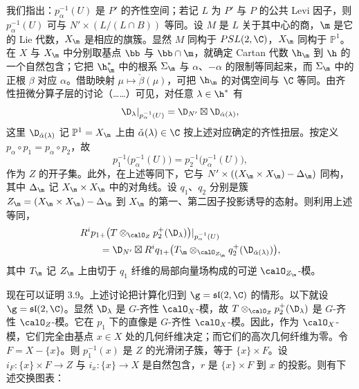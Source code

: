 我们指出：$p_\alpha^{-1}(U)$ 是 $P'$ 的齐性空间；若记 $L$ 为 $P'$ 与 $P$ 的公共 Levi 因子，则 $p_\alpha^{-1}(U)$ 可与 $N'\times(L/(L\cap B))$ 等同。设 $M$ 是 $L$ 关于其中心的商，$\m$ 是它的 Lie 代数，$X_\m$ 是相应的旗簇。显然 $M$ 同构于 $PSL(2,\C)$，$X_\m$ 同构于 $\mathbb{P}^1$。在 $X$ 与 $X_\m$ 中分别取基点 $\bb$ 与 $\bb\cap\m$，就确定 Cartan 代数 $\h_\m$ 到 $\h$ 的一个自然包含；它把 $\h^*_\m$ 中的根系 $\Sigma_\m$ 与 $\alpha$、$-\alpha$ 的限制等同起来，而 $\Sigma_\m$ 中的正根 $\beta$ 对应 $\alpha$。借助映射 $\mu\mapsto\check{\beta}(\mu)$，可把 $\h_\m$ 的对偶空间与 $\C$ 等同。由齐性扭微分算子层的讨论（……）可见，对任意 $\lambda\in\h^*$ 有
$$\D_\lambda|_{p_\alpha^{-1}(U)}=\D_{N'}\boxtimes\D_{\check{\alpha}(\lambda)},$$
这里 $\D_{\check{\alpha}(\lambda)}$ 记 $\mathbb{P}^1=X_\m$ 上由 $\check{\alpha}(\lambda)\in\C$ 按上述对应确定的齐性扭层。按定义 $p_\alpha\circ p_1=p_\alpha\circ p_2$，故
$$p_1^{-1}\bigl(p_\alpha^{-1}(U)\bigr)=p_2^{-1}\bigl(p_\alpha^{-1}(U)\bigr),$$
作为 $Z$ 的开子集。此外，在上述等同下，它与 $N'\times((X_\m\times X_\m)-\Delta_\m)$ 同构，其中 $\Delta_\m$ 记 $X_\m\times X_\m$ 中的对角线。设 $q_1$、$q_2$ 分别是簇 $Z_\m=(X_\m\times X_\m)-\Delta_\m$ 到 $X_\m$ 的第一、第二因子投影诱导的态射。则利用上述等同，
\begin{align*}
&R^ip_{1+}\bigl(T\otimes_{\calO_Z}p_2^+(\D_\lambda)\bigr)|_{p_\alpha^{-1}(U)}\\
&\qquad=\D_{N'}\boxtimes R^iq_{1+}\bigl(T_\m\otimes_{\calO_{Z_\m}}q_2^+(\D_{\check{\alpha}(\lambda)})\bigr),
\end{align*}
其中 $T_\m$ 记 $Z_\m$ 上由切于 $q_1$ 纤维的局部向量场构成的可逆 $\calO_{Z_\m}$-模。

现在可以证明 3.9。上述讨论把计算化归到 $\g=\mathfrak{sl}(2,\C)$ 的情形。以下就设 $\g=\mathfrak{sl}(2,\C)$。显然 $\D_\lambda$ 是 $G$-齐性 $\calO_X$-模，故 $T\otimes_{\calO_Z}p_2^+(\D_\lambda)$ 是 $G$-齐性 $\calO_Z$-模。它在 $p_1$ 下的直像是 $G$-齐性 $\calO_X$-模。因此，作为 $\calO_X$-模，它们完全由基点 $x\in X$ 处的几何纤维决定；而它们的高次几何纤维为零。令 $F=X-\{x\}$。则 $p_1^{-1}(x)$ 是 $Z$ 的光滑闭子簇，等于 $\{x\}\times F$。设 $i_F:\{x\}\times F\to Z$ 与 $i_x:\{x\}\to X$ 是自然包含，$r$ 是 $\{x\}\times F$ 到 $x$ 的投影。则有下述交换图表：
\begin{center}
\end{center}
